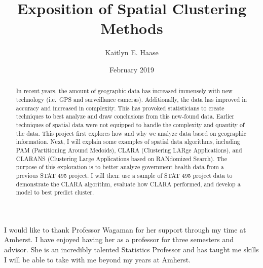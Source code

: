 \documentclass[12pt,twoside]{amherstthesis}
\title{Exposition of Spatial Clustering Methods}
\author{Kaitlyn E. Haase}
\date{February 2019}
\begin{document}
      \maketitle
  
  \frontmatter %
  \pagestyle{empty} %

      \begin{acknowledgements}
      I would like to thank Professor Wagaman for her support through my time
      at Amherst. I have enjoyed having her as a professor for three semesters
      and advisor. She is an incredibly talented Statistics Professor and has
      taught me skills I will be able to take with me beyond my years at
      Amherst.
    \end{acknowledgements}
  
  

      \hypersetup{linkcolor=black}
    \setcounter{tocdepth}{2}
    \tableofcontents
  
      \listoftables
  
      \listoffigures
  
      \begin{abstract}
      In recent years, the amount of geographic data has increased immensely
      with new technology (i.e.~GPS and surveillance cameras). Additionally,
      the data has improved in accuracy and increased in complexity. This has
      provoked statisticians to create techniques to best analyze and draw
      conclusions from this new-found data. Earlier techniques of spatial data
      were not equipped to handle the complexity and quantity of the data.
      This project first explores how and why we analyze data based on
      geographic information. Next, I will explain some examples of spatial
      data algorithms, including PAM (Partitioning Around Medoids), CLARA
      (Clustering LARge Applications), and CLARANS (Clustering Large
      Applications based on RANdomized Search). The purpose of this
      exploration is to better analyze government health data from a previous
      STAT 495 project. I will then: use a sample of STAT 495 project data to
      demonstrate the CLARA algorithm, evaluate how CLARA performed, and
      develop a model to best predict cluster.
    \end{abstract}
  
  
  \mainmatter %
  \pagestyle{fancyplain} %
\end{document}
